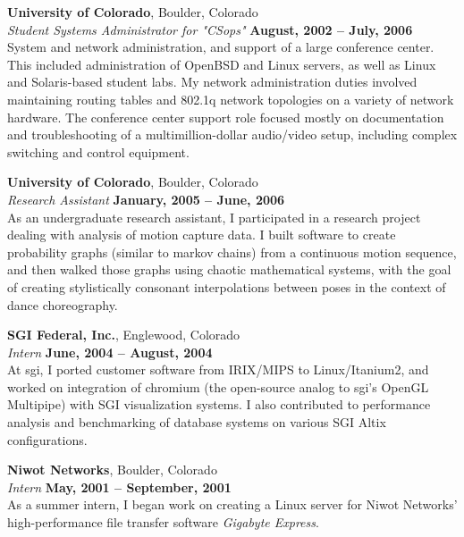\documentclass[margin,line]{resume}
\begin{document}
\begin{resume}
    \ifcv
        \newpage
        {\bf University of Colorado}, Boulder, Colorado \vspace{2mm}\\\vspace{1mm}%
        {\sl Student Systems Administrator for "CSops"} \hfill {\bf August, 2002 -- July, 2006}\\
        System and network administration, and support of a large conference
        center. This included administration of OpenBSD and Linux servers, as well
        as Linux and Solaris-based student labs. My network administration duties
        involved maintaining routing tables and 802.1q network topologies on a
        variety of network hardware. The conference center support role focused
        mostly on documentation and troubleshooting of a multimillion-dollar
        audio/video setup, including complex switching and control equipment.

        {\bf University of Colorado}, Boulder, Colorado \vspace{2mm}\\\vspace{1mm}%
        {\sl Research Assistant} \hfill {\bf January, 2005 -- June, 2006}\\
        As an undergraduate research assistant, I participated in a research
        project dealing with analysis of motion capture data. I built software to
        create probability graphs (similar to markov chains) from a continuous
        motion sequence, and then walked those graphs using chaotic mathematical
        systems, with the goal of creating stylistically consonant interpolations
        between poses in the context of dance choreography.

        {\bf SGI Federal, Inc.}, Englewood, Colorado \vspace{2mm}\\\vspace{1mm}%
        {\sl Intern} \hfill {\bf June, 2004 -- August, 2004}\\
        At sgi, I ported customer software from IRIX/MIPS to Linux/Itanium2, and
        worked on integration of chromium (the open-source analog to sgi's OpenGL
        Multipipe) with SGI visualization systems.  I also contributed to
        performance analysis and benchmarking of database systems on various SGI
        Altix configurations.

        {\bf Niwot Networks}, Boulder, Colorado \vspace{2mm}\\\vspace{1mm}%
        {\sl Intern} \hfill {\bf May, 2001 -- September, 2001}\\
        As a summer intern, I began work on creating a Linux server for Niwot
        Networks' high-performance file transfer software {\sl Gigabyte Express}.


\end{resume}
\end{document}
